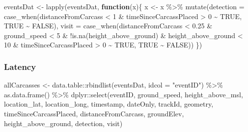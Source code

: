 \documentclass[
]{article}
\newenvironment{Shaded}{\begin{snugshade}}{\end{snugshade}}
\newcommand{\AttributeTok}[1]{\textcolor[rgb]{0.77,0.63,0.00}{#1}}
\newcommand{\ConstantTok}[1]{\textcolor[rgb]{0.00,0.00,0.00}{#1}}
\newcommand{\ControlFlowTok}[1]{\textcolor[rgb]{0.13,0.29,0.53}{\textbf{#1}}}
\newcommand{\DecValTok}[1]{\textcolor[rgb]{0.00,0.00,0.81}{#1}}
\newcommand{\FloatTok}[1]{\textcolor[rgb]{0.00,0.00,0.81}{#1}}
\newcommand{\FunctionTok}[1]{\textcolor[rgb]{0.00,0.00,0.00}{#1}}
\newcommand{\NormalTok}[1]{#1}
\newcommand{\OtherTok}[1]{\textcolor[rgb]{0.56,0.35,0.01}{#1}}
\newcommand{\SpecialCharTok}[1]{\textcolor[rgb]{0.00,0.00,0.00}{#1}}
\newcommand{\StringTok}[1]{\textcolor[rgb]{0.31,0.60,0.02}{#1}}
\begin{document}
\begin{Shaded}
\begin{Highlighting}[]
\NormalTok{eventsDat }\OtherTok{\textless{}{-}} \FunctionTok{lapply}\NormalTok{(eventsDat, }\ControlFlowTok{function}\NormalTok{(x)\{}
\NormalTok{  x }\OtherTok{\textless{}{-}}\NormalTok{ x }\SpecialCharTok{\%\textgreater{}\%}
    \FunctionTok{mutate}\NormalTok{(}\AttributeTok{detection =} \FunctionTok{case\_when}\NormalTok{(distanceFromCarcass }\SpecialCharTok{\textless{}} \DecValTok{1} \SpecialCharTok{\&} 
\NormalTok{                                   timeSinceCarcassPlaced }\SpecialCharTok{\textgreater{}} \DecValTok{0}  \SpecialCharTok{\textasciitilde{}} \ConstantTok{TRUE}\NormalTok{,}
                                 \ConstantTok{TRUE} \SpecialCharTok{\textasciitilde{}} \ConstantTok{FALSE}\NormalTok{),}
           \AttributeTok{visit =} \FunctionTok{case\_when}\NormalTok{(distanceFromCarcass }\SpecialCharTok{\textless{}} \FloatTok{0.25} \SpecialCharTok{\&}\NormalTok{ ground\_speed }\SpecialCharTok{\textless{}} \DecValTok{5} \SpecialCharTok{\&} 
                               \SpecialCharTok{!}\FunctionTok{is.na}\NormalTok{(height\_above\_ground) }\SpecialCharTok{\&}\NormalTok{ height\_above\_ground }\SpecialCharTok{\textless{}} \DecValTok{10} \SpecialCharTok{\&}
\NormalTok{                               timeSinceCarcassPlaced }\SpecialCharTok{\textgreater{}} \DecValTok{0} \SpecialCharTok{\textasciitilde{}} 
                               \ConstantTok{TRUE}\NormalTok{,}
                             \ConstantTok{TRUE} \SpecialCharTok{\textasciitilde{}} \ConstantTok{FALSE}\NormalTok{))}
\NormalTok{\})}
\end{Highlighting}
\end{Shaded}

\hypertarget{latency}{%
\subsubsection{Latency}\label{latency}}

\begin{Shaded}
\begin{Highlighting}[]
\NormalTok{allCarcasses }\OtherTok{\textless{}{-}}\NormalTok{ data.table}\SpecialCharTok{::}\FunctionTok{rbindlist}\NormalTok{(eventsDat, }\AttributeTok{idcol =} \StringTok{"eventID"}\NormalTok{) }\SpecialCharTok{\%\textgreater{}\%}
  \FunctionTok{as.data.frame}\NormalTok{() }\SpecialCharTok{\%\textgreater{}\%}
\NormalTok{  dplyr}\SpecialCharTok{::}\FunctionTok{select}\NormalTok{(eventID, ground\_speed, height\_above\_msl, location\_lat, location\_long, timestamp, dateOnly, trackId, geometry, timeSinceCarcassPlaced, distanceFromCarcass, groundElev, height\_above\_ground, detection, visit)}
\end{Highlighting}
\end{Shaded}
\end{document}
